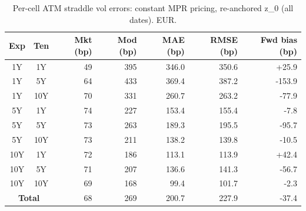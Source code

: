 \begin{table}[H]
\centering
\caption{Per-cell ATM straddle vol errors: constant MPR pricing, re-anchored z_0 (all dates). EUR.}
\label{tab:constant_mpr_anchored_per_cell_all}
\small
\begin{tabular}{@{}ccrrrrr@{}}
\toprule
\textbf{Exp} & \textbf{Ten} & \textbf{Mkt (bp)} & \textbf{Mod (bp)} & \textbf{MAE (bp)} & \textbf{RMSE (bp)} & \textbf{Fwd bias (bp)} \\
\midrule
  1Y & 1Y & 49 & 395 & 346.0 & 350.6 & +25.9 \\
  1Y & 5Y & 64 & 433 & 369.4 & 387.2 & -153.9 \\
  1Y & 10Y & 70 & 331 & 260.7 & 263.2 & -77.9 \\
  \midrule
  5Y & 1Y & 74 & 227 & 153.4 & 155.4 & -7.8 \\
  5Y & 5Y & 73 & 263 & 189.3 & 195.5 & -95.7 \\
  5Y & 10Y & 73 & 211 & 138.2 & 139.8 & -10.5 \\
  \midrule
  10Y & 1Y & 72 & 186 & 113.1 & 113.9 & +42.4 \\
  10Y & 5Y & 71 & 207 & 136.6 & 141.3 & -56.7 \\
  10Y & 10Y & 69 & 168 & 99.4 & 101.7 & -2.3 \\
  \midrule
  \multicolumn{2}{c}{\textbf{Total}} & 68 & 269 & 200.7 & 227.9 & -37.4 \\
\bottomrule
\end{tabular}
\end{table}